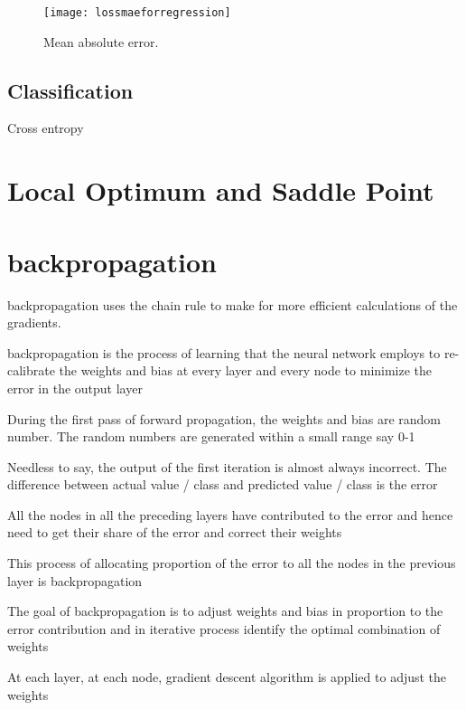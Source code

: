  	\begin{figure}[h]
		\centering
		\texttt{[image: lossmaeforregression]}
		\caption[Mean absolute error]{Mean absolute error.}
		\label{fig:lossmaeforregression}
	\end{figure}

	\subsection{Classification}
Cross entropy


	\section{Local Optimum and Saddle Point}

	\section{backpropagation}
backpropagation uses the chain rule to make for more efficient calculations of the gradients.

	\begin{bulletedlist}
		\item backpropagation is the process of learning that the neural network employs to re-calibrate the weights and bias at every layer and every node to minimize the error in the output layer
		\item During the first pass of forward propagation, the weights and bias are random number. The random numbers are generated within a small range say 0-1
		\item Needless to say, the output of the first iteration is almost always incorrect. The difference between actual value / class and predicted value / class is the error
		\item All the nodes in all the preceding layers have contributed to the error and hence need to get their share of the error and correct their weights
		\item This process of allocating proportion of the error to all the nodes in the previous layer is backpropagation
		\item The goal of backpropagation is to adjust weights and bias in proportion to the error contribution and in iterative process identify the optimal combination of weights
		\item At each layer, at each node, gradient descent algorithm is applied to adjust the weights
	\end{bulletedlist}

